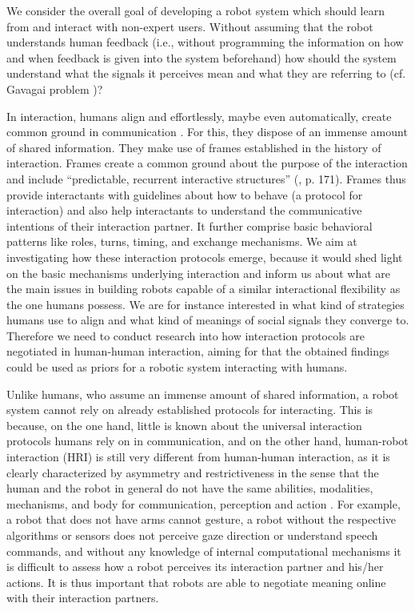 
We consider the overall goal of developing a robot system which should learn from and interact with non-expert users. Without assuming that the robot understands human feedback (i.e., without programming the information on how and when feedback is given into the system beforehand) how should the system understand what the signals it perceives mean and what they are referring to (cf. Gavagai problem \cite{quine1964word})?

In interaction, humans align and effortlessly, maybe even automatically, create common ground in communication \cite{clark1991grounding,pickering2004toward}. For this, they dispose of an immense amount of shared information. They make use of frames established in the history of interaction. Frames create a common ground about the purpose of the interaction \cite{tomasello2009cultural,rohlfing2013learning} and include ``predictable, recurrent interactive structures'' (\cite{ninio1996pragmatic}, p. 171). Frames thus provide interactants with guidelines about how to behave (a protocol for interaction) and also help interactants to understand the communicative intentions of their interaction partner. It further comprise basic behavioral patterns like roles, turns, timing, and exchange mechanisms. We aim at investigating how these interaction protocols emerge, because it would shed light on the basic mechanisms underlying interaction and inform us about what are the main issues in building robots capable of a similar interactional flexibility as the one humans possess. We are for instance interested in what kind of strategies humans use to align and what kind of meanings of social signals they converge to. Therefore we need to conduct research into how interaction protocols are negotiated in human-human interaction, aiming for that the obtained findings could be used as priors for a robotic system interacting with humans.

Unlike humans, who assume an immense amount of shared information, a robot system cannot rely on already established protocols for interacting. This is because, on the one hand, little is known about the universal interaction protocols humans rely on in communication, and on the other hand, human-robot interaction (HRI) is still very different from human-human interaction, as it is clearly characterized by asymmetry and restrictiveness in the sense that the human and the robot in general do not have the same abilities, modalities, mechanisms, and body for communication, perception and action \cite{lohse2010investigating}. For example, a robot that does not have arms cannot gesture, a robot without the respective algorithms or sensors does not perceive gaze direction or understand speech commands, and without any knowledge of internal computational mechanisms it is difficult to assess how a robot perceives its interaction partner and his/her actions. It is thus important that robots are able to negotiate meaning online with their interaction partners.

